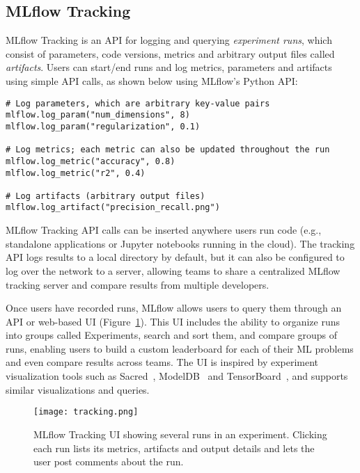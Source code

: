 \documentclass[11pt]{article}
\begin{document}

\subsection{MLflow Tracking}

MLflow Tracking is an API for logging and querying \emph{experiment runs}, which consist of parameters, code versions, metrics and arbitrary output files called \emph{artifacts}. Users can start/end runs and log metrics, parameters and artifacts using simple API calls, as shown below using MLflow's Python API:

\begin{Verbatim}[frame=single,fontsize=\small,samepage=true]
# Log parameters, which are arbitrary key-value pairs
mlflow.log_param("num_dimensions", 8)
mlflow.log_param("regularization", 0.1)

# Log metrics; each metric can also be updated throughout the run
mlflow.log_metric("accuracy", 0.8)
mlflow.log_metric("r2", 0.4)

# Log artifacts (arbitrary output files)
mlflow.log_artifact("precision_recall.png")
\end{Verbatim}

MLflow Tracking API calls can be inserted anywhere users run code (e.g., standalone applications or Jupyter notebooks running in the cloud). The tracking API logs results to a local directory by default, but it can also be configured to log over the network to a server, allowing teams to share a centralized MLflow tracking server and compare results from multiple developers.

Once users have recorded runs, MLflow allows users to query them through an API or web-based UI (Figure~\ref{fig:tracking-ui}). This UI includes the ability to organize runs into groups called Experiments, search and sort them, and compare groups of runs, enabling users to build a custom leaderboard for each of their ML problems and even compare results across teams. The UI is inspired by experiment visualization tools such as Sacred~\cite{sacred}, ModelDB~\cite{modeldb} and TensorBoard~\cite{tensorboard}, and supports similar visualizations and queries.

\begin{figure}[h]
\centering
\texttt{[image: tracking.png]}\caption{MLflow Tracking UI showing several runs in an experiment. Clicking each run lists its metrics, artifacts and output details and lets the user post comments about the run.}
\label{fig:tracking-ui}
\end{figure}
\end{document}
